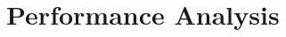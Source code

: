 \documentclass[10pt,aspectratio=169]{beamer}
\begin{document}
\section{Performance Analysis}
%
%
%
\end{document}
